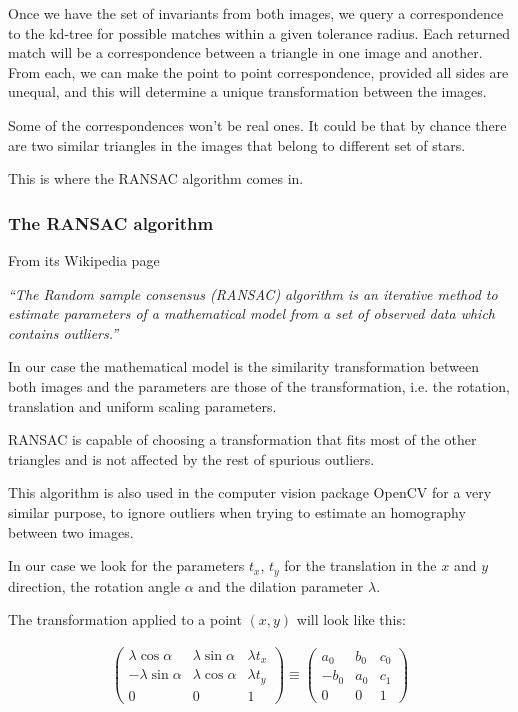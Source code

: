 Once we have the set of invariants from both images, we query a correspondence to the kd-tree for possible matches within a given tolerance radius. 
Each returned match will be a correspondence between a triangle in one image and another. 
From each, we can make the point to point correspondence, provided all sides are unequal, and this will determine a unique transformation between the images.

Some of the correspondences won't be real ones. It could be that by chance there are two similar triangles in the images that belong to different set of stars.

This is where the RANSAC algorithm comes in.

\subsubsection{The RANSAC algorithm}

From its Wikipedia page 

{\em ``The Random sample consensus (RANSAC) algorithm is an iterative method to estimate parameters of a mathematical model from a set of observed data which contains outliers.''}

In our case the mathematical model is the similarity transformation between both images and the parameters are those of the transformation, i.e. the rotation, translation and uniform scaling parameters.

RANSAC is capable of choosing a transformation that fits most of the other triangles and is not affected by the rest of spurious outliers. 

This algorithm is also used in the computer vision package OpenCV for a very similar purpose, to ignore outliers when trying to estimate an homography between two images. 

In our case we look for the parameters $t_x$, $t_y$ for the translation in the $x$ and $y$ direction, the rotation angle $\alpha$ and the dilation parameter $\lambda$.

The transformation applied to a point $(x,y)$ will look like this:

\begin{align*}
\left(
 \begin{array}{lll} 
 \lambda \cos \alpha & \lambda \sin \alpha& \lambda t_x \\
 - \lambda \sin \alpha & \lambda \cos \alpha& \lambda t_y \\
 0 & 0 & 1
 \end{array}
\right)
\equiv
\left(
 \begin{array}{lll} 
 a_0 & b_0 & c_0 \\
-b_0 & a_0 & c_1 \\
 0 & 0 & 1
 \end{array}
\right)
\end{align*}

